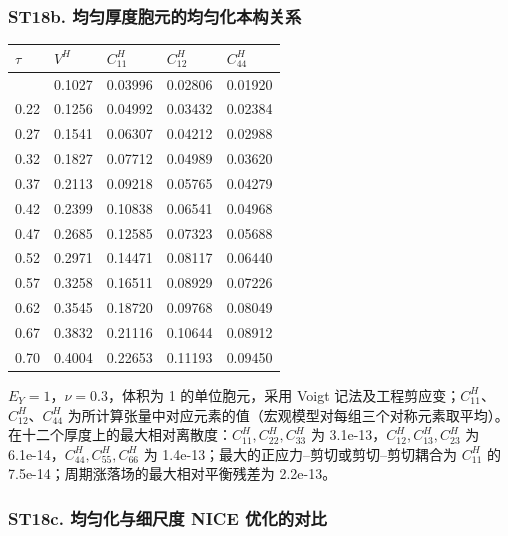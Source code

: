 \documentclass[preprint,12pt,authoryear]{elsarticle}
\begin{document}
\subsubsection{ST18b. 均匀厚度胞元的均匀化本构关系}

{\small
\begin{longtable}[]{@{}lllll@{}}
\toprule\noalign{}
\(\tau\) & \(V^H\) & \(C^H_{11}\) & \(C^H_{12}\) & \(C^H_{44}\) \\
\midrule\noalign{}
\endhead
\bottomrule\noalign{}
\endlastfoot
0.18 & 0.1027 & 0.03996 & 0.02806 & 0.01920 \\
0.22 & 0.1256 & 0.04992 & 0.03432 & 0.02384 \\
0.27 & 0.1541 & 0.06307 & 0.04212 & 0.02988 \\
0.32 & 0.1827 & 0.07712 & 0.04989 & 0.03620 \\
0.37 & 0.2113 & 0.09218 & 0.05765 & 0.04279 \\
0.42 & 0.2399 & 0.10838 & 0.06541 & 0.04968 \\
0.47 & 0.2685 & 0.12585 & 0.07323 & 0.05688 \\
0.52 & 0.2971 & 0.14471 & 0.08117 & 0.06440 \\
0.57 & 0.3258 & 0.16511 & 0.08929 & 0.07226 \\
0.62 & 0.3545 & 0.18720 & 0.09768 & 0.08049 \\
0.67 & 0.3832 & 0.21116 & 0.10644 & 0.08912 \\
0.70 & 0.4004 & 0.22653 & 0.11193 & 0.09450 \\
\end{longtable}}

\(E_Y=1\)，\(\nu=0.3\)，体积为 1 的单位胞元，采用 Voigt 记法及工程剪应变；\(C^H_{11}\)、\(C^H_{12}\)、\(C^H_{44}\) 为所计算张量中对应元素的值（宏观模型对每组三个对称元素取平均）。在十二个厚度上的最大相对离散度：\(C^H_{11},C^H_{22},C^H_{33}\) 为 3.1e-13，\(C^H_{12},C^H_{13},C^H_{23}\) 为 6.1e-14，\(C^H_{44},C^H_{55},C^H_{66}\) 为 1.4e-13；最大的正应力--剪切或剪切--剪切耦合为 \(C^H_{11}\) 的 7.5e-14；周期涨落场的最大相对平衡残差为 2.2e-13。

\subsubsection{ST18c. 均匀化与细尺度 NICE 优化的对比}
\end{document}
